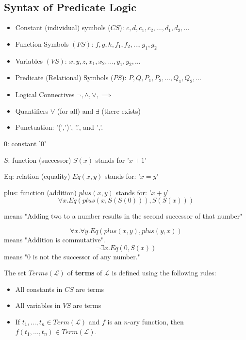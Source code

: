 \documentclass[english, 11pt]{article}
\begin{document}
  \subsection{Syntax of Predicate Logic}
  \begin{itemize}
    \item Constant (individual) symbols ($CS$): $c, d,c_1,c_2,\ldots,d_1,d_2,\ldots$
    \item Function Symbols $(FS)$: $f,g,h,f_1,f_2,\ldots,g_1,g_2$
    \item Variables $(VS)$: $x,y,z,x_1,x_2,\ldots,y_1,y_2,\ldots$
    \item Predicate (Relational) Symbols ($PS$): $P,Q,P_1,P_2,\ldots,Q_1,Q_2,\ldots$
    \item Logical Connectives $\neg, \land, \lor, \implies$
    \item Quantifiers $\forall$ (for all) and $\exists$ (there exists)
    \item Punctuation: '(',')', '.', and ','.
  \end{itemize}
  \begin{exmp}
    \item 0: constant '0'
    \item $S$: function (successor) $S(x)$ stands for '$x + 1$'
    \item Eq: relation (equality) $Eq(x,y)$ stands for: '$x = y$'
    \item plus: function (addition) $plus(x,y)$ stands for: '$x+y$'
    \[ \forall x.Eq(plus(x,S(S(0))), S(S(x))) \]
  \end{exmp}
  means "Adding two to a number results in the second successor of that number"
  \begin{exmp}
    \[ \forall x. \forall y. Eq(plus (x,y), plus(y,x)) \]
    means "Addition is commutative".
    \[ \neg \exists x. Eq(0,S(x)) \]
    means "0 is not the successor of any number."
  \end{exmp}
  \begin{defn}[term]\label{terms}
  The set $Terms(\mathcal{L})$ of \textbf{terms} of $\mathcal{L}$ is defined using the following rules:
  \begin{itemize}
    \item All constants in $CS$ are terms
    \item All variables in $VS$ are terms
    \item If $t_1,\ldots,t_n \in Term(\mathcal{L})$ and $f$ is an $n$-ary function, then $f(t_1,\ldots,t_n) \in Term(\mathcal{L})$.
  \end{itemize}
  \end{defn}
\end{document}
